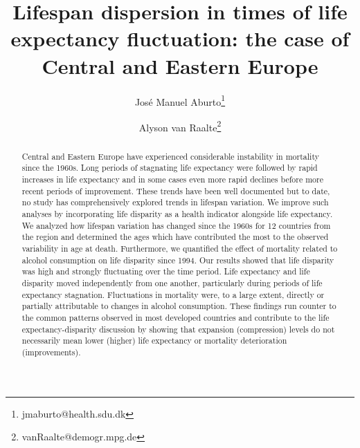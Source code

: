 \documentclass{article}
\title{Lifespan dispersion in times of life expectancy fluctuation: the case of Central and Eastern Europe}
\author[1]{Jos\'e Manuel Aburto\thanks{jmaburto@health.sdu.dk}}
\author[2]{Alyson van Raalte\thanks{vanRaalte@demogr.mpg.de}}
\affil[1]{Department of Public Health, MaxO, University of Southern Denmark}
\affil[2]{Max Planck Institute for Demographic Research}
\begin{document}
\maketitle

\begin{abstract}
Central and Eastern Europe have experienced considerable instability in mortality since the 1960s. Long periods of stagnating life expectancy were followed by rapid increases in life expectancy and in some cases even more rapid declines before more recent periods of improvement. These trends have been well documented but to date, no study has comprehensively explored trends in lifespan variation.  We improve such analyses by incorporating life disparity as a health indicator alongside life expectancy. We analyzed how lifespan variation has changed since the 1960s for 12 countries from the region and determined the ages which have contributed the most to the observed variability in age at death. Furthermore, we quantified the effect of mortality related to alcohol consumption on life disparity since 1994. Our results showed that life disparity was high and strongly fluctuating over the time period. Life expectancy and life disparity moved independently from one another, particularly during periods of life expectancy stagnation. Fluctuations in mortality were, to a large extent, directly or partially attributable to changes in alcohol consumption. These findings run counter to the common patterns observed in most developed countries and contribute to the life expectancy-disparity discussion by showing that expansion (compression) levels do not necessarily mean lower (higher) life expectancy or mortality deterioration (improvements). 
\end{abstract}


\newpage
\end{document}
